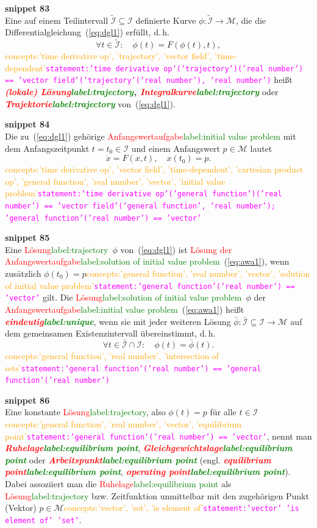 \documentclass[a4paper,twoside,english,ngerman,deutsch,german,sectrefs,envcountsame,envcountchap]{svmono}
\newcommand{\setref}[2]{\textcolor{red}{#1}\textcolor{green}{#2}}
\newcommand{\snippet}[1]{\textbf{snippet #1}\\}
\newcommand{\eqnote}[2]{\textcolor{orange}{#1}\textcolor{magenta}{\texttt{#2}}}
\begin{document}
\snippet{83}
Eine auf einem Teilintervall $\tilde{\mathcal{I}}\subseteq\mathcal{I}$
definierte Kurve $\phi:\tilde{\mathcal{I}}\to\mathcal{M}$, die die
Differentialgleichung~(\ref{eq:dgl1}) erfüllt, d.\,h.
\[
\forall t\in\tilde{\mathcal{I}}:\quad\dot{\phi}(t)=F(\phi(t),t),
\]\eqnote{concepts:'time derivative op', 'trajectory', 'vector field', 'time-dependent'}{statement:'time derivative op'('trajectory')('real number') == 'vector field'('trajectory'('real number'), 'real number')}
heißt \textbf{\em \setref{(lokale) Lösung}{label:trajectory}, \setref{Integralkurve}{label:trajectory}}
oder \textbf{\em \setref{Trajektorie}{label:trajectory}} von~(\ref{eq:dgl1}).

\snippet{84}
Die zu~(\ref{eq:dgl1}) gehörige \setref{Anfangswertaufgabe}{label:initial value problem}
mit dem Anfangszeitpunkt $t=t_{0}\in\mathcal{I}$ und einem Anfangswert
$p\in\mathcal{M}$ lautet
\begin{equation}
\dot{x}=F(x,t),\quad x(t_{0})=p.\label{eq:awa1}
\end{equation}\eqnote{concepts:'time derivative op', 'vector field', 'time-dependent', 'cartesian product op', 'general function', 'real number', 'vector', 'initial value problem'}{statement:'time derivative op'('general function')('real number') == 'vector field'('general function', 'real number'); 'general function'('real number') == 'vector'}

\snippet{85}
Eine \setref{Lösung}{label:trajectory}~$\phi$ von~(\ref{eq:dgl1}) ist \setref{Lösung der Anfangswertaufgabe}{label:solution of initial value problem}~(\ref{eq:awa1}),
wenn zusätzlich $\phi(t_{0})=p$\eqnote{concepts:'general function', 'real number', 'vector', 'solution of initial value problem'}{statement:'general function'('real number') == 'vector'} gilt. Die \setref{Lösung}{label:solution of initial value problem}~$\phi$ der \setref{Anfangswertaufgabe}{label:initial value problem}~(\ref{eq:awa1})
heißt \textbf{\em \setref{eindeutig}{label:unique}}, wenn sie mit jeder weiteren Lösung $\bar{\phi}:\bar{\mathcal{I}}\subseteq\mathcal{I}\to\mathcal{M}$
auf dem gemeinsamen Existenzintervall übereinstimmt, d.\,h.
\[
\forall t\in\bar{\mathcal{I}}\cap\mathcal{I}:\quad\phi(t)=\bar{\phi}(t).
\]\eqnote{concepts:'general function', 'real number', 'intersection of sets'}{statement:'general function'('real number') == 'general function'('real number')}

\snippet{86}
Eine konstante \setref{Lösung}{label:trajectory}, also $\phi(t)=p$ für alle $t\in\mathcal{I}$\eqnote{concepts:'general function', 'real number', 'vector', 'equilibrium point'}{statement:'general function'('real number') == 'vector'},
nennt man \textbf{\em \setref{Ruhelage}{label:equilibrium point}}, \textbf{\em \setref{Gleichgewichtslage}{label:equilibrium point}}
oder \textbf{\em \setref{Arbeitspunkt}{label:equilibrium point}} (engl. \textbf{\em \setref{equilibrium
point}{label:equilibrium point}}, \textbf{\em \setref{operating point}{label:equilibrium point}}). Dabei assoziiert man die \setref{Ruhelage}{label:equilibrium point}
als \setref{Lösung}{label:trajectory} bzw. Zeitfunktion unmittelbar mit den zugehörigen Punkt
(Vektor) $p\in\mathcal{M}$\eqnote{concepts:'vector', 'set', 'is element of'}{statement:'vector' 'is element of' 'set'}.
\end{document}
